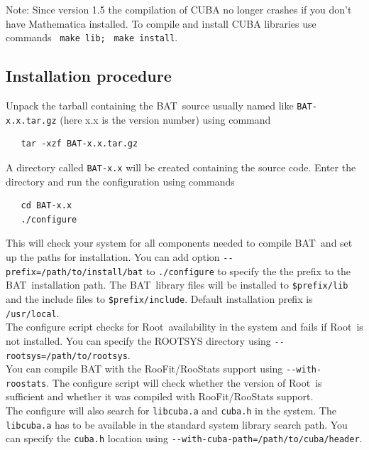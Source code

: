 \documentclass[11pt, a4paper]{article}
\newcommand{\bat}{{\sc BAT}}
\newcommand{\Root}{{\sc Root}}
\begin{document}
\noindent
Note: Since version 1.5 the compilation of CUBA no longer crashes if
you don't have Mathematica installed. To compile and install CUBA
libraries use commands ~\verb|make lib;| ~\verb|make install|.


\subsection{Installation procedure}

Unpack the tarball containing the \bat\ source usually named like
\verb|BAT-x.x.tar.gz| (here x.x is the version number) using command
%
\begin{verbatim}
   tar -xzf BAT-x.x.tar.gz
\end{verbatim}
%
A directory called \verb|BAT-x.x| will be created containing the source code.
Enter the directory and run the configuration using commands
%
\begin{verbatim}
   cd BAT-x.x
   ./configure
\end{verbatim}

\noindent 
This will check your system for all components needed to compile \bat\
and set up the paths for installation. You can add option
\verb|--prefix=/path/to/install/bat| to \verb|./configure| to specify
the the prefix to the \bat\ installation path. The \bat\ library files
will be installed to \verb|$prefix/lib| and the include files to
\verb|$prefix/include|. Default installation prefix is
\verb|/usr/local|. \\

\noindent
The configure script checks for \Root\ availability in the system and
fails if \Root\ is not installed. You can specify the ROOTSYS directory
using \verb|--rootsys=/path/to/rootsys|. \\

\noindent
You can compile BAT with the RooFit/RooStats support using
\verb|--with-roostats|. The configure script will check whether the version of
\Root\ is sufficient and whether it was compiled with RooFit/RooStats
support. \\

\noindent
The configure will also search for \verb|libcuba.a| and \verb|cuba.h|
in the system.  The \verb|libcuba.a| has to be available in the
standard system library search path. You can specify the \verb|cuba.h|
location using \verb|--with-cuba-path=/path/to/cuba/header|. \\
\end{document}

